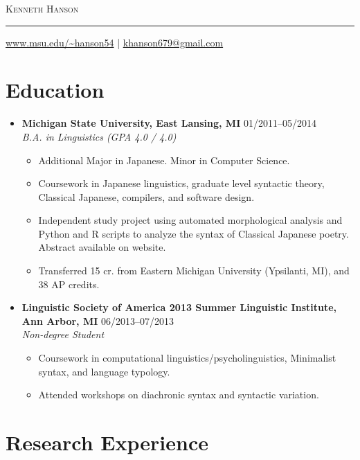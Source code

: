 \documentclass[10pt,oneside]{article}
\makeatletter
\newcommand{\name}{Kenneth Hanson}
\newcommand{\email}{khanson679@gmail.com}
\newcommand{\website}{%
	\href{https://www.msu.edu/\textasciitilde hanson54}%
		 {www.msu.edu/\textasciitilde hanson54}%
}
\newcommand{\bigname}[1]{
	\begin{center}\textsc{\Huge#1}\end{center}
	\vspace{-8pt}
}
\newcommand{\ressection}[1]{
	\vspace{-12pt}
	\section*{#1}
}
\newcommand{\resbigitem}[4]{
	\item
	\textbf{#1} \hfill #2 \\
	\textit{#3} \hfill \textit{#4}
}
\makeatother
\begin{document}


\bigname{\name}

\rule{\textwidth}{1pt}

{\small \hfill \website{} | \href{mailto:\email}{\email}}


\ressection{Education}

\begin{itemize}
	\resbigitem
		{Michigan State University, East Lansing, MI}
		{01/2011--05/2014}
		{B.A. in Linguistics (GPA 4.0 / 4.0)}
		{}
	\begin{itemize}
		\item{Additional Major in Japanese. Minor in Computer Science.}
		\item{Coursework in Japanese linguistics, graduate level syntactic theory, Classical Japanese, compilers, and software design.}
		\item{Independent study project using automated morphological analysis and Python and R scripts to analyze the syntax of Classical Japanese poetry. Abstract available on website.}
		\item{Transferred 15 cr. from Eastern Michigan University (Ypsilanti, MI), and 38 AP credits.}
	\end{itemize}
	
	\resbigitem
		{Linguistic Society of America 2013 Summer Linguistic Institute, Ann Arbor, MI}
		{06/2013--07/2013}
		{Non-degree Student}
		{}
	\begin{itemize}
		\item{Coursework in computational linguistics/psycholinguistics, Minimalist syntax, and language typology.}
		\item{Attended workshops on diachronic syntax and syntactic variation.}
	\end{itemize}
\end{itemize}


\ressection{Research Experience}
\end{document}
